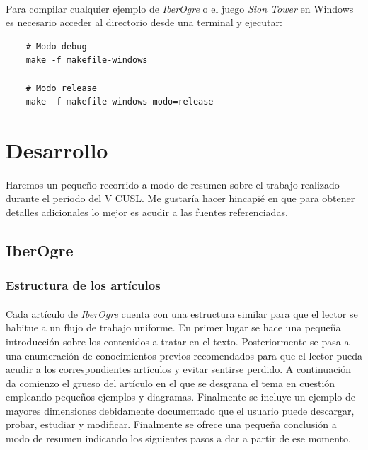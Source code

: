 \documentclass[16pt,spanish]{article}
\def \juego{\emph {Sion Tower} }
\def \wiki{\emph{IberOgre} }
\begin{document}
\paragraph{}
Para compilar cualquier ejemplo de \wiki o el juego \juego en Windows 
es necesario acceder al directorio desde una terminal y ejecutar:

\begin{verbatim}
    # Modo debug
    make -f makefile-windows
    
    # Modo release
    make -f makefile-windows modo=release
\end{verbatim}

\section{Desarrollo}

\paragraph{}
Haremos un pequeño recorrido a modo de resumen sobre  el trabajo realizado
durante el periodo del V CUSL. Me gustaría hacer hincapié en que para
obtener detalles adicionales lo mejor es acudir a las fuentes referenciadas.

\subsection{IberOgre}

\subsubsection{Estructura de los artículos}

\paragraph{}
Cada artículo de \wiki cuenta con una estructura similar para que el lector
se habitue a un flujo de trabajo uniforme.
En primer lugar se hace una pequeña introducción sobre los contenidos a tratar
en el texto. Posteriormente se pasa a una enumeración de conocimientos
previos recomendados para que el lector pueda acudir a los correspondientes
artículos y evitar sentirse perdido. A continuación da comienzo el grueso
del artículo en el que se desgrana el tema en cuestión empleando pequeños
ejemplos y diagramas. Finalmente se incluye un ejemplo de mayores dimensiones
debidamente documentado que el usuario puede descargar, probar, estudiar
y modificar. Finalmente se ofrece una pequeña conclusión a modo de resumen
indicando los siguientes pasos a dar a partir de ese momento.
\end{document}
